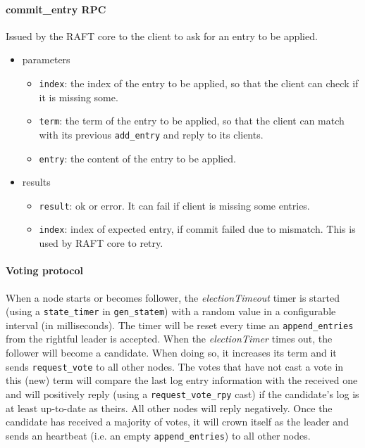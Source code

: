 \documentclass[a4paper]{article}
\begin{document}
\paragraph{commit\_entry RPC}
Issued by the RAFT core to the client to ask for an entry to be applied.
\begin{itemize}
    \item parameters
    \begin{itemize}
        \item \texttt{index}: the index of the entry to be applied, so that the client can check if it is missing some.
        \item \texttt{term}: the term of the entry to be applied, so that the client can match with its previous \texttt{add\_entry} and reply to its clients.
        \item \texttt{entry}: the content of the entry to be applied.
    \end{itemize}
    \item results
    \begin{itemize}
        \item \texttt{result}: ok or error. It can fail if client is missing some entries.
        \item \texttt{index}: index of expected entry, if commit failed due to 
            mismatch. This is used by RAFT core to retry.
    \end{itemize}
\end{itemize}

\paragraph{Voting protocol}
When a node starts or becomes follower, the \emph{electionTimeout} timer is 
started (using a \texttt{state\_timer} in \texttt{gen\_statem}) with a 
random value in a configurable interval (in milliseconds). 
The timer will be reset every time an \texttt{append\_entries} from the 
rightful leader is accepted.
When the \emph{electionTimer} times out, the follower will become a candidate.
When doing so, it increases its term and it sends \texttt{request\_vote}
to all other nodes. The votes that have not cast a vote in this (new) term will
compare the last log entry information with 
the received one and will positively reply (using a \texttt{request\_vote\_rpy} 
cast) if the candidate's log is at least 
up-to-date as theirs. All other nodes will reply negatively. 
Once the candidate has received a majority of votes, it will crown itself
as the leader and sends an heartbeat (i.e. an empty \texttt{append\_entries})
to all other nodes.
\end{document}
